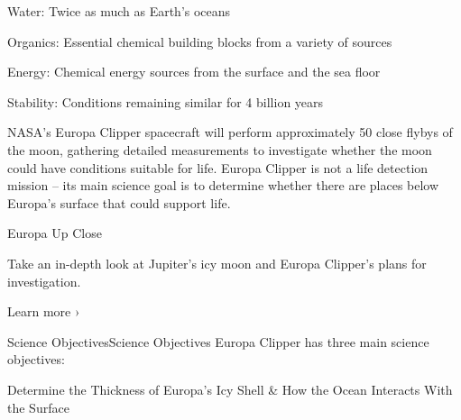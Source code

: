 \documentclass[a4paper,11pt]{article}
\begin{document}
\begin{docenv}
{Water: Twice as much as Earth’s oceans 

Organics: Essential chemical building blocks from a variety of sources

Energy: Chemical energy sources from the surface and the sea floor

Stability: Conditions remaining similar for 4 billion years

NASA's Europa Clipper spacecraft will perform approximately 50 close flybys of the moon, gathering detailed measurements to investigate whether the moon could have conditions suitable for life. Europa Clipper is not a life detection mission – its main science goal is to determine whether there are places below Europa’s surface that could support life.

Europa Up Close

Take an in-depth look at Jupiter's icy moon and Europa Clipper's plans for investigation.

Learn more ›

Science ObjectivesScience Objectives
Europa Clipper has three main science objectives: 

Determine the Thickness of Europa’s Icy Shell \& How the Ocean Interacts With the Surface}
\end{docenv}
\end{document}
